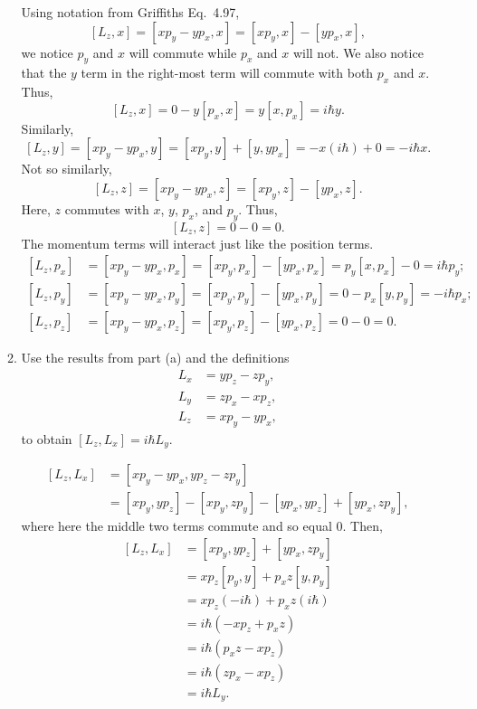 \documentclass[a4paper, 12pt]{config/homework}
\begin{document}
\begin{enumerate}
\begin{enumerate}[label=(\alph*)]
Using notation from Griffiths Eq.\ 4.97,
\[\left[L_z, x\right] = \left[xp_y - yp_x, x\right] = \left[xp_y,x\right] - \left[yp_x,x\right],\]
we notice \(p_y\) and \(x\) will commute while \(p_x\) and \(x\) will not. We also notice that the \(y\) term in the right-most term will commute with both \(p_x\) and \(x\). Thus,
\[\left[L_z, x\right] = 0 - y\left[p_x,x\right] = y\left[x,p_x\right] = i\hbar y.\]
Similarly,
\[\left[L_z, y\right] = \left[xp_y-yp_x, y\right] = \left[xp_y,y\right] + \left[y,yp_x\right] = -x\left(i\hbar\right) + 0 = -i\hbar x.\]
Not so similarly,
\[\left[L_z, z\right] = \left[xp_y - yp_x, z\right] = \left[xp_y, z\right] - \left[yp_x, z\right].\]
Here, \(z\) commutes with \(x\), \(y\), \(p_x\), and \(p_y\). Thus,
\[\left[L_z, z\right] = 0 - 0 = 0.\]
The momentum terms will interact just like the position terms.
\begin{align*}
\left[L_z, p_x\right] &= \left[xp_y - yp_x, p_x\right] = \left[xp_y, p_x\right] - \left[yp_x, p_x\right] = p_y\left[x, p_x\right] - 0 = i\hbar p_y; \\
\left[L_z, p_y\right] &= \left[xp_y - yp_x, p_y\right] = \left[xp_y, p_y\right] - \left[yp_x, p_y\right] = 0 - p_x\left[y,p_y\right] = -i\hbar p_x; \\
\left[L_z, p_z\right] &= \left[xp_y - yp_x, p_z\right] = \left[xp_y, p_z\right] - \left[yp_x, p_z\right] = 0 - 0 = 0.
\end{align*}

\pagebreak
\item Use the results from part (a) and the definitions
\begin{align*}
L_x&=yp_z-zp_y, \\
L_y&=zp_x-xp_z, \\
L_z&=xp_y-yp_x,
\end{align*}
to obtain \([L_z,L_x]=i\hbar L_y\).

\begin{align*}
\left[L_z, L_x\right] &= \left[xp_y - yp_x, yp_z - zp_y\right]
\\&= \left[xp_y,yp_z\right] - \left[xp_y, zp_y\right] - \left[yp_x, yp_z\right] + \left[yp_x, zp_y\right],
\end{align*}
where here the middle two terms commute and so equal 0. Then,
\begin{align*}
\left[L_z, L_x\right] &= \left[xp_y,yp_z\right] + \left[yp_x, zp_y\right]
\\&= xp_z\left[p_y,y\right] + p_x z \left[y,p_y\right]
\\&= xp_z(-i\hbar) + p_x z (i\hbar)
\\&= i\hbar\left(-xp_z + p_x z\right)
\\&= i\hbar\left(p_x z - xp_z\right)
\\&= i\hbar\left(z p_x - x p_z\right)
\\&= i\hbar L_y.
\end{align*}


\end{enumerate}
\end{enumerate}
\end{document}
